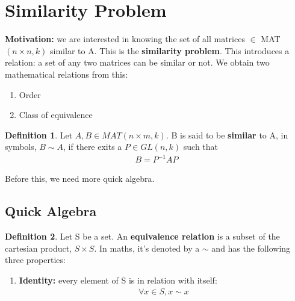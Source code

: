 \documentclass[a4paper, 12pt]{article}
\theoremstyle{definition}
\theoremstyle{definition}
\newtheorem{defn}{Definition}[section]
\theoremstyle{definition}
\theoremstyle{definition}
\begin{document}
{\section{Similarity Problem}
\textbf{Motivation:} we are interested in knowing the set of all matrices $\in$ MAT $(n \times n, k)$ similar to A. This is the \textbf{similarity problem}. This introduces a relation: a set of any two matrices can be similar or not. We obtain two mathematical relations from this: 
\begin{enumerate}
	\item Order
	\item Class of equivalence
\end{enumerate}
\begin{defn}
	Let $A, B \in MAT (n \times m, k)$. B is said to be \textbf{similar} to A, in symbols, $B \sim A$, if there exits a $P \in GL(n,k)$ such that
	\begin{align*}
		B = P^{-1} A P 
	\end{align*}
\end{defn}
Before this, we need more quick algebra. 
\subsection{Quick Algebra}
\begin{defn}
	Let S be a set. An \textbf{equivalence relation} is a subset of the cartesian product, $S \times S$. In maths, it's denoted by a $\sim$ and has the following three properties: 
	\begin{enumerate}
		\item \textbf{Identity:} every element of S is in relation with itself: 
		\begin{align*}
			\forall x \in S, x \sim x
		\end{align*}


\end{enumerate}
\end{defn}}
\end{document}
